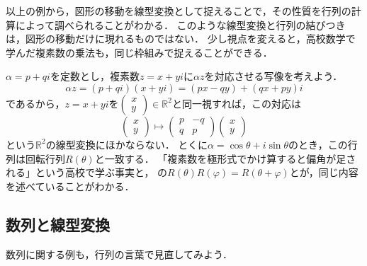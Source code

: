 以上の例から，図形の移動を線型変換として捉えることで，その性質を行列の計算によって調べられることがわかる．
このような線型変換と行列の結びつきは，図形の移動だけに現れるものではない．
少し視点を変えると，高校数学で学んだ複素数の乗法も，同じ枠組みで捉えることができる．

\begin{mycolumn}
  $\alpha = p + qi$を定数とし，複素数$z = x + yi$に$\alpha z$を対応させる写像を考えよう．
  \[
    \alpha z = (p + qi)(x + yi) = (px - qy) + (qx + py)i
  \]
  であるから，$z = x + yi$を$\begin{pmatrix} x \\ y \end{pmatrix} \in \mathbb{R}^2$と同一視すれば，この対応は
  \[
    \begin{pmatrix} x \\ y \end{pmatrix} \longmapsto
    \begin{pmatrix} p & -q \\ q & p \end{pmatrix}
    \begin{pmatrix} x \\ y \end{pmatrix}
  \]
  という$\mathbb{R}^2$の線型変換にほかならない．
  とくに$\alpha = \cos\theta + i\sin\theta$のとき，この行列は回転行列$R(\theta)$と一致する．
  「複素数を極形式でかけ算すると偏角が足される」という高校で学ぶ事実と，
  の$R(\theta)R(\varphi) = R(\theta + \varphi)$とが，同じ内容を述べていることがわかる．
\end{mycolumn}

\subsection{数列と線型変換}

数列に関する例も，行列の言葉で見直してみよう．
\enlargethispage{2mm}


